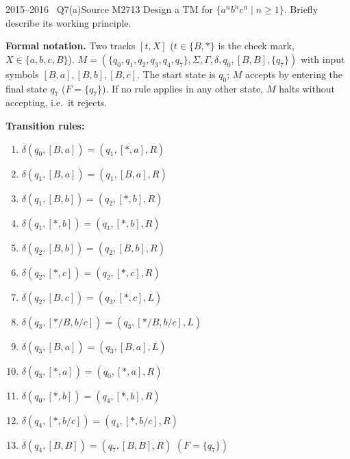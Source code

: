 \documentclass[11pt,a4paper]{article}
\begin{document}
\begin{question}{2015--2016 \textbullet\ Q7(a)}{Source M27}{13}
Design a TM for $\{a^nb^nc^n\mid n\ge1\}$. Briefly describe its working principle.
\end{question}
\begin{solution}
\textbf{Formal notation.} Two tracks $[t,X]$ ($t\in\{B,\ast\}$ is the check mark, $X\in\{a,b,c,B\}$). $M=(\{q_0,q_1,q_2,q_3,q_4,q_7\},\Sigma,\Gamma,\delta,q_0,[B,B],\{q_7\})$ with input symbols $[B,a],[B,b],[B,c]$. The start state is $q_0$; $M$ accepts by entering the final state $q_7$ ($F=\{q_7\}$). If no rule applies in any other state, $M$ halts without accepting, i.e.\ it rejects.
\par\noindent\textbf{Transition rules:}
{\small\begin{enumerate}[label=\arabic*.,itemsep=0pt]
\item $\delta(q_0,[B,a])=(q_1,[\ast,a],R)$
\item $\delta(q_1,[B,a])=(q_1,[B,a],R)$
\item $\delta(q_1,[B,b])=(q_2,[\ast,b],R)$
\item $\delta(q_1,[\ast,b])=(q_1,[\ast,b],R)$
\item $\delta(q_2,[B,b])=(q_2,[B,b],R)$
\item $\delta(q_2,[\ast,c])=(q_2,[\ast,c],R)$
\item $\delta(q_2,[B,c])=(q_3,[\ast,c],L)$
\item $\delta(q_3,[\ast/B,b/c])=(q_3,[\ast/B,b/c],L)$
\item $\delta(q_3,[B,a])=(q_3,[B,a],L)$
\item $\delta(q_3,[\ast,a])=(q_0,[\ast,a],R)$
\item $\delta(q_0,[\ast,b])=(q_4,[\ast,b],R)$
\item $\delta(q_4,[\ast,b/c])=(q_4,[\ast,b/c],R)$
\item $\delta(q_4,[B,B])=(q_7,[B,B],R)$ \quad $(F=\{q_7\})$
\end{enumerate}}
\end{solution}
\end{document}
